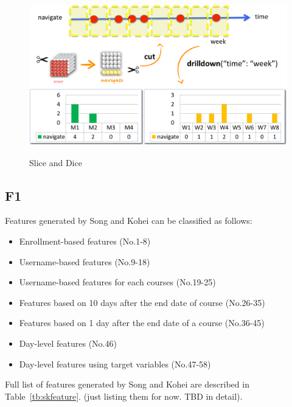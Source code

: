 \begin{figure}[!t]
	\caption{Slice and Dice}
	\centering
	\includegraphics[width=1 \textwidth]{slice_and_dice}
	\label{fig:slice}
\end{figure}

\subsection{F1}

Features generated by Song and Kohei can be classified as follows:

\begin{itemize}
  \setlength\itemsep{0em}
  \item Enrollment-based features (No.1-8)
  \item Username-based features (No.9-18)
  \item Username-based features for each courses (No.19-25) 
  \item Features based on 10 days after the end date of course (No.26-35)
  \item Features based on 1 day after the end date of a course (No.36-45)
  \item Day-level features (No.46)
  \item Day-level features using target variables (No.47-58)
\end{itemize}

Full list of features generated by Song and Kohei are described in Table~\ref{tb:skfeature}.
(just listing them for now. TBD in detail).

